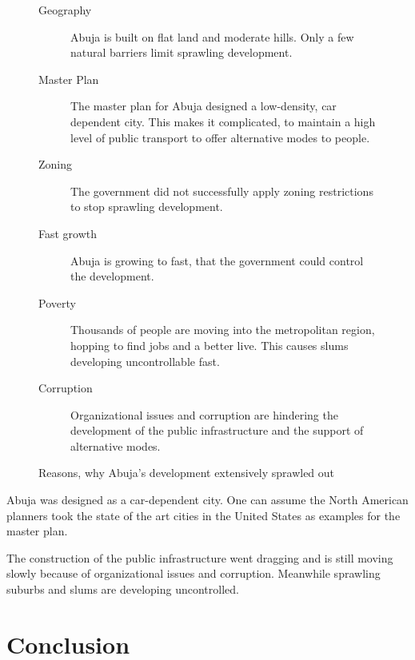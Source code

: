 \documentclass{article}
\begin{document}
\begin{multicols}{2}
			\begin{figure}[H]
				\begin{description}
					\item [Geography] Abuja is built on flat land and moderate hills. Only a few natural barriers limit sprawling development.
					\item [Master Plan] The master plan for Abuja designed a low-density, car dependent city. This makes it complicated, to maintain a high level of public transport to offer alternative modes to people.
					\item [Zoning] The government did not successfully apply zoning restrictions to stop sprawling development.
					\item [Fast growth] Abuja is growing to fast, that the government could control the development.
					\item [Poverty] Thousands of people are moving into the metropolitan region, hopping to find jobs and a better live. This causes slums developing uncontrollable fast.
					\item [Corruption] Organizational issues and corruption are hindering the development of the public infrastructure and the support of alternative modes.
				\end{description}
				\caption{Reasons, why Abuja's development extensively sprawled out}
				\label{fig:list:abuja-development-reasons}
			\end{figure}
			
			Abuja was designed as a car-dependent city. One can assume the North American planners took the state of the art cities in the United States as examples for the master plan.
			
			The construction of the public infrastructure went dragging and is still moving slowly because of organizational issues and corruption. Meanwhile sprawling suburbs and slums are developing uncontrolled.
			

	\clearpage
	\section{Conclusion}

	

\end{multicols}
\end{document}
